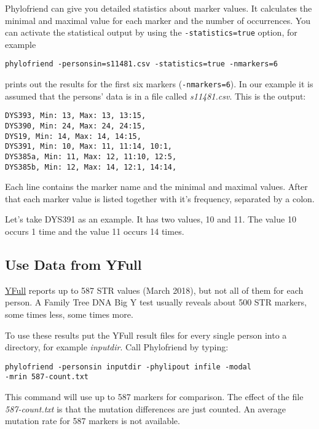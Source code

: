 Phylofriend can give you detailed statistics about marker
values. It calculates the minimal and maximal value for each
marker and the number of occurrences. You can activate the
statistical output by using the \texttt{-statistics=true}
option, for example

\vspace{1ex}
\noindent\texttt{phylofriend -personsin=s11481.csv -statistics=true -nmarkers=6}
\vspace{1ex}

\noindent prints out the results for the first six markers
(\texttt{-nmarkers=6}). In our example it is assumed that
the persons' data is in a file called \emph{s11481.csv}.
This is the output:

\begin{verbatim}
DYS393, Min: 13, Max: 13, 13:15,
DYS390, Min: 24, Max: 24, 24:15,
DYS19, Min: 14, Max: 14, 14:15,
DYS391, Min: 10, Max: 11, 11:14, 10:1,
DYS385a, Min: 11, Max: 12, 11:10, 12:5,
DYS385b, Min: 12, Max: 14, 12:1, 14:14,
\end{verbatim}

\noindent
Each line contains the marker name and the minimal and
maximal values. After that each marker value is listed
together with it's frequency, separated by a colon.

Let's take DYS391 as an example. It has two values,
10 and 11. The value 10 occurs 1 time and the value
11 occurs 14 times.


\subsection{Use Data from YFull}

\href{http://yfull.com/}{YFull} reports up to 587 STR values
(March 2018), but not all of them for each person. A Family
Tree DNA Big Y test usually reveals about 500 STR markers,
some times less, some times more.

To use these results put the YFull result files for every
single person into a directory, for example \emph{inputdir}.
Call Phylofriend by typing:

\vspace{1ex}
\noindent\texttt{phylofriend -personsin inputdir -phylipout infile -modal\\
-mrin 587-count.txt}
\vspace{1ex}

\noindent
This command will use up to 587 markers for comparison.
The effect of the file \emph{587-count.txt} is that the 
mutation differences are just counted. An average mutation
rate for 587 markers is not available.


